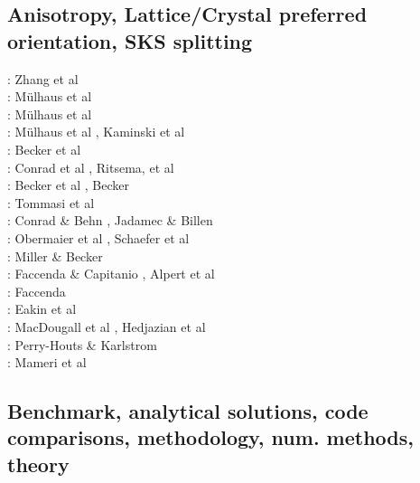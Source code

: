 \subsection{Anisotropy, Lattice/Crystal preferred orientation, SKS splitting}
\label{sec:topics:anisotropy}

\begin{scriptsize}
\nineteeneightythree: Zhang et al \cite{zhhj93}\\
\twothousandtwo: M\"ulhaus et al \cite{mudm02}\\
\twothousandthree: M\"ulhaus et al \cite{mumc03}\\
\twothousandfour: M\"ulhaus et al \cite{mumc04}, Kaminski et al \cite{karb04}\\
\twothousandsix: Becker et al \cite{besb06}\\
\twothousandseven: Conrad et al \cite{cobs07}, Ritsema, et al \cite{rimb07}\\
\twothousandeight: Becker et al \cite{beke08}, Becker \cite{beck08}\\
\twothousandnine: Tommasi et al \cite{tokv09}\\
\twothousandten: Conrad \& Behn \cite{cobe10}, Jadamec \& Billen \cite{jabi10a}\\
\twothousandeleven: Obermaier et al \cite{obbh11}, Schaefer et al \cite{scbb11}\\
\twothousandtwelve: Miller \& Becker \cite{mibe12}\\
\twothousandthirteen: Faccenda \& Capitanio \cite{faca13}, Alpert et al \cite{almb13}\\
\twothousandfourteen: Faccenda \cite{facc14}\\
\twothousandfifteen: Eakin et al \cite{ealw15}\\
\twothousandseventeen: MacDougall et al \cite{majf17}, Hedjazian et al \cite{hegd17}\\
\twothousandeighteen: Perry-Houts \& Karlstrom \cite{peka18}\\
\twothousandnineteen: Mameri et al \cite{mats19}
\end{scriptsize}

\subsection{Benchmark, analytical solutions, code comparisons, methodology, num. methods, theory}

